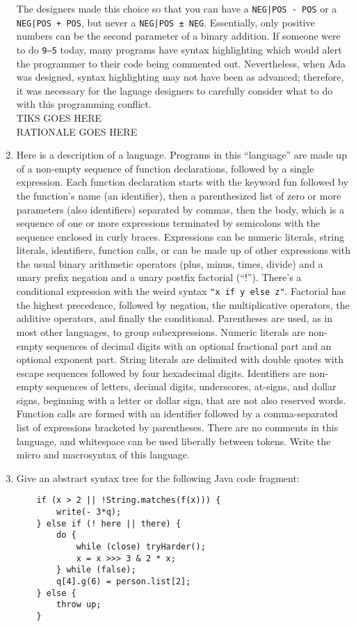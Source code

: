 \documentclass{article}
\begin{document}
\begin{enumerate}
    The designers made this choice so that you can have a \texttt{NEG|POS - POS} or a \texttt{NEG|POS + POS}, but never a \texttt{NEG|POS ± NEG}. Essentially, only positive numbers can be the second parameter of a binary addition. If someone were to do \texttt{9--5} today, many programs have syntax highlighting which would alert the programmer to their code being commented out. Nevertheless, when Ada was designed, syntax highlighting may not have been as advanced; therefore, it was necessary for the laguage designers to carefully consider what to do with this programming conflict. \\
    TIKS GOES HERE \\
    RATIONALE GOES HERE \\
    \pagebreak
    \item Here is a description of a language. Programs in this ``language'' are made up of a non-empty sequence of function declarations, followed by a single expression. Each function declaration starts with the keyword fun followed by the function's name (an identifier), then a parenthesized list of zero or more parameters (also identifiers) separated by commas, then the body, which is a sequence of one or more expressions terminated by semicolons with the sequence enclosed in curly braces. Expressions can be numeric literals, string literals, identifiers, function calls, or can be made up of other expressions with the usual binary arithmetic operators (plus, minus, times, divide) and a unary prefix negation and a unary postfix factorial (``!''). There's a conditional expression with the weird syntax \texttt{"x if y else z"}. Factorial has the highest precedence, followed by negation, the multiplicative operators, the additive operators, and finally the conditional. Parentheses are used, as in most other languages, to group subexpressions. Numeric literals are non-empty sequences of decimal digits with an optional fractional part and an optional exponent part. 
    String literals are delimited with double quotes with escape sequences followed by four hexadecimal digits. Identifiers are non-empty sequences of letters, decimal digits, underscores, at-signs, and dollar signs, beginning with a letter or dollar sign, that are not also reserved words. Function calls are formed with an identifier followed by a comma-separated list of expressions bracketed by parentheses. There are no comments in this language, and whitespace can be used liberally between tokens.
    Write the micro and macrosyntax of this language.
    
    \pagebreak
    \item Give an abstract syntax tree for the following Java code fragment:
    \begin{verbatim}
    if (x > 2 || !String.matches(f(x))) {
        write(- 3*q);
    } else if (! here || there) {
        do {
            while (close) tryHarder();
            x = x >>> 3 & 2 * x;
        } while (false);
        q[4].g(6) = person.list[2];
    } else {
        throw up;
    }
    \end{verbatim}
\end{enumerate}
\end{document}
